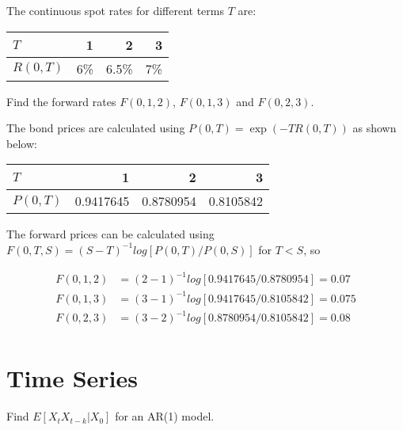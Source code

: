 \documentclass{article}
\numberwithin{questioncounter}{section}
\begin{document}
\begin{question}
The continuous spot rates for different terms $T$ are:

\begin{center}
\begin{tabular}{l r r r}
\hline
$T$ & 1 & 2 & 3 \\ \hline
$R(0, T)$ & 6\% & 6.5\% & 7\% \\ \hline
\end{tabular}
\end{center}

Find the forward rates $F(0, 1, 2)$, $F(0, 1, 3)$ and $F(0, 2, 3)$.
\end{question}

\begin{solution}
The bond prices are calculated using $P(0, T) = \exp(-T R(0, T))$ as shown below:

\begin{center}
\begin{tabular}{l r r r}
\hline
$T$ & 1 & 2 & 3 \\ \hline
$P(0, T)$ & 0.9417645 &  0.8780954 & 0.8105842 \\ \hline
\end{tabular}
\end{center}

The forward prices can be calculated using $F(0, T, S) = (S-T)^{-1} log[P(0, T)/P(0, S)]$ for $T < S$, so

\begin{align*}
F(0, 1, 2) &= (2-1)^{-1} log[0.9417645 / 0.8780954] =  0.07 \\
F(0, 1, 3) &= (3-1)^{-1} log[0.9417645 / 0.8105842] = 0.075 \\
F(0, 2, 3) &= (3-2)^{-1} log[0.8780954 / 0.8105842] = 0.08 \\
\end{align*}

\end{solution}

\newpage
\setcounter{section}{2}
\section{Time Series}

\begin{question}
Find $E[X_{t} X_{t-k} | X_{0}]$ for an AR(1) model.
\end{question}
\end{document}
